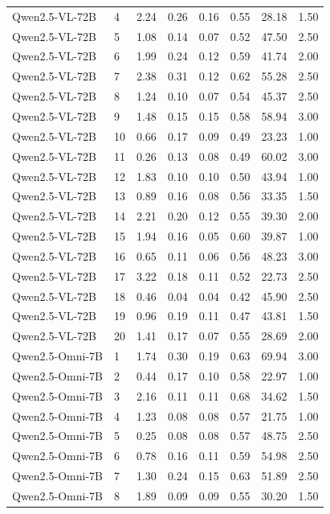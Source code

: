 \documentclass{article}
\theoremstyle{plain}
\theoremstyle{definition}
\theoremstyle{remark}
\begin{document}
\begin{table}[t]
{\begin{tabular}{llrrrrrr}
Qwen2.5-VL-72B & 4 & 2.24 & 0.26 & 0.16 & 0.55 & 28.18 & 1.50 \\
Qwen2.5-VL-72B & 5 & 1.08 & 0.14 & 0.07 & 0.52 & 47.50 & 2.50 \\
Qwen2.5-VL-72B & 6 & 1.99 & 0.24 & 0.12 & 0.59 & 41.74 & 2.00 \\
Qwen2.5-VL-72B & 7 & 2.38 & 0.31 & 0.12 & 0.62 & 55.28 & 2.50 \\
Qwen2.5-VL-72B & 8 & 1.24 & 0.10 & 0.07 & 0.54 & 45.37 & 2.50 \\
Qwen2.5-VL-72B & 9 & 1.48 & 0.15 & 0.15 & 0.58 & 58.94 & 3.00 \\
Qwen2.5-VL-72B & 10 & 0.66 & 0.17 & 0.09 & 0.49 & 23.23 & 1.00 \\
Qwen2.5-VL-72B & 11 & 0.26 & 0.13 & 0.08 & 0.49 & 60.02 & 3.00 \\
Qwen2.5-VL-72B & 12 & 1.83 & 0.10 & 0.10 & 0.50 & 43.94 & 1.00 \\
Qwen2.5-VL-72B & 13 & 0.89 & 0.16 & 0.08 & 0.56 & 33.35 & 1.50 \\
Qwen2.5-VL-72B & 14 & 2.21 & 0.20 & 0.12 & 0.55 & 39.30 & 2.00 \\
Qwen2.5-VL-72B & 15 & 1.94 & 0.16 & 0.05 & 0.60 & 39.87 & 1.00 \\
Qwen2.5-VL-72B & 16 & 0.65 & 0.11 & 0.06 & 0.56 & 48.23 & 3.00 \\
Qwen2.5-VL-72B & 17 & 3.22 & 0.18 & 0.11 & 0.52 & 22.73 & 2.50 \\
Qwen2.5-VL-72B & 18 & 0.46 & 0.04 & 0.04 & 0.42 & 45.90 & 2.50 \\
Qwen2.5-VL-72B & 19 & 0.96 & 0.19 & 0.11 & 0.47 & 43.81 & 1.50 \\
Qwen2.5-VL-72B & 20 & 1.41 & 0.17 & 0.07 & 0.55 & 28.69 & 2.00 \\
Qwen2.5-Omni-7B & 1 & 1.74 & 0.30 & 0.19 & 0.63 & 69.94 & 3.00 \\
Qwen2.5-Omni-7B & 2 & 0.44 & 0.17 & 0.10 & 0.58 & 22.97 & 1.00 \\
Qwen2.5-Omni-7B & 3 & 2.16 & 0.11 & 0.11 & 0.68 & 34.62 & 1.50 \\
Qwen2.5-Omni-7B & 4 & 1.23 & 0.08 & 0.08 & 0.57 & 21.75 & 1.00 \\
Qwen2.5-Omni-7B & 5 & 0.25 & 0.08 & 0.08 & 0.57 & 48.75 & 2.50 \\
Qwen2.5-Omni-7B & 6 & 0.78 & 0.16 & 0.11 & 0.59 & 54.98 & 2.50 \\
Qwen2.5-Omni-7B & 7 & 1.30 & 0.24 & 0.15 & 0.63 & 51.89 & 2.50 \\
Qwen2.5-Omni-7B & 8 & 1.89 & 0.09 & 0.09 & 0.55 & 30.20 & 1.50 \\

\end{tabular}}
\end{table}
\end{document}
